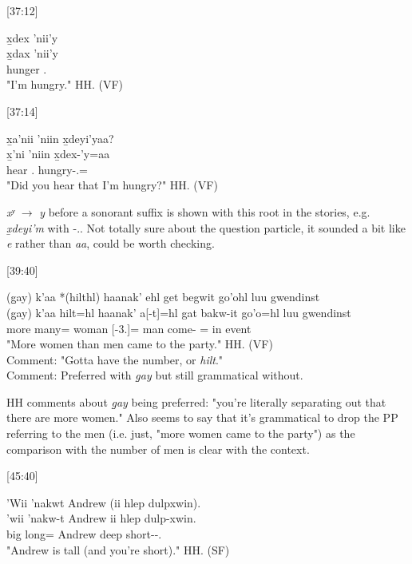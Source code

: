 [37:12]
\begin{exe}
    \ex \glll
    x̱dex ’nii’y \\
    x̱dax ’nii’y \\
    hunger \Fsg.\Iii \\
    \glt "I'm hungry." \hfill HH.\ElicitationDate{} (VF)
\end{exe}

[37:14]
\begin{exe}
    \ex \glll
    x̱a’nii ’niin x̱deyi’yaa? \\
    x̱’ni ’niin x̱dex-’y=aa\\
    hear \Ssg.\Iii{} hungry-\Fsg.\Ii=\Q \\
    \glt "Did you hear that I'm hungry?" \hfill HH.\ElicitationDate{} (VF)
\end{exe}

\textit{xʸ} \(\rightarrow\) \textit{y} before a sonorant suffix is shown with this root in the stories, e.g. \textit{x̱deyi'm} with -\Fpl.\Ii. Not totally sure about the question particle, it sounded a bit like \textit{e} rather than \textit{aa}, could be worth checking. 

[39:40]
\begin{exe}
    \ex\glll
    (g̱ay) k'aa *(hilthl) haanak' ehl get begwit go'ohl luu gwendinst \\
    (g̱ay) k'aa hilt=hl haanak' a[-t]=hl gat bakw-it go'o=hl luu gwendinst \\
    \Cntr{} more many=\Cn{} woman \Prep{}[-3.\Ii]=\Cn{} man come-\Sx{} \Loc=\Cn{} in event \\
    \glt "More women than men came to the party." \hfill HH.\ElicitationDate{} (VF) \\
    Comment: "Gotta have the number, or \textit{hilt}." \\
    Comment: Preferred with \textit{g̱ay} but still grammatical without. 
\end{exe}

HH comments about \textit{g̱ay} being preferred: "you're literally separating out that there are more women." Also seems to say that it's grammatical to drop the PP referring to the men (i.e. just, "more women came to the party") as the comparison with the number of men is clear with the context.

[45:40]
\begin{exe}
    \ex \glll
    ’Wii ’nakwt Andrew (ii hlep dulpxwin). \\
    ’wii ’nakw-t Andrew ii hlep dulp-xwin. \\ 
    big long=\Pn{} Andrew \Ccnj{} deep short-\Val-\Ssg.\Ii{} \\
    \glt "Andrew is tall (and you're short)." \hfill HH.\ElicitationDate{} (SF)
\end{exe}


